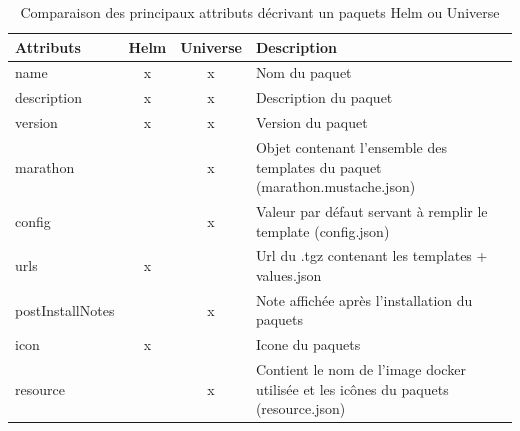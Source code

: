 \documentclass[11pt,fleqn]{book} %
\begin{document}
\begin{table}[H]
\hspace{-1.8cm}
\begin{tabular}{@{}lccl@{}}
\toprule
Attributs        & \multicolumn{1}{l}{Helm} & \multicolumn{1}{l}{Universe} & Description                                                                 \\ \midrule
name             & x                        & x                            & Nom du paquet                                                               \\
description      & x                        & x                            & Description du paquet                                                       \\
version          & x                        & x                            & Version du paquet                                                           \\
marathon         &                          & x                            & Objet contenant l'ensemble des templates du paquet (marathon.mustache.json) \\
config           &                          & x                            & Valeur par défaut servant à remplir le template (config.json)               \\
urls             & x                        &                              & Url du .tgz contenant les templates + values.json                            \\
postInstallNotes &                          & x                            & Note affichée après l'installation du paquets                               \\
icon             & x                        &                              & Icone du paquets                                                            \\
resource         &                          & x                            & Contient le nom de l'image docker utilisée et les icônes du paquets (resource.json)        \\ \bottomrule
\end{tabular}
\caption{Comparaison des principaux attributs décrivant un paquets Helm ou Universe \newline}
\label{tab:my-table}
\end{table}
\end{document}
